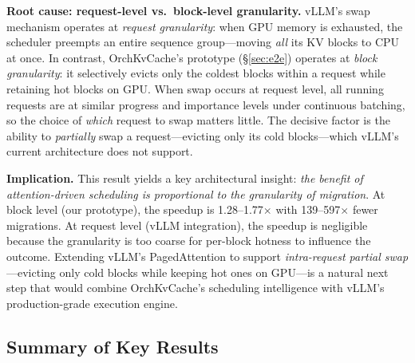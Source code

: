 \documentclass[conference]{IEEEtran}
\begin{document}
\textbf{Root cause: request-level vs.\ block-level granularity.} vLLM's swap mechanism operates at \emph{request granularity}: when GPU memory is exhausted, the scheduler preempts an entire sequence group---moving \emph{all} its KV blocks to CPU at once. In contrast, OrchKvCache's prototype (\S\ref{sec:e2e}) operates at \emph{block granularity}: it selectively evicts only the coldest blocks within a request while retaining hot blocks on GPU. When swap occurs at request level, all running requests are at similar progress and importance levels under continuous batching, so the choice of \emph{which} request to swap matters little. The decisive factor is the ability to \emph{partially} swap a request---evicting only its cold blocks---which vLLM's current architecture does not support.

\textbf{Implication.} This result yields a key architectural insight: \emph{the benefit of attention-driven scheduling is proportional to the granularity of migration}. At block level (our prototype), the speedup is 1.28--1.77$\times$ with 139--597$\times$ fewer migrations. At request level (vLLM integration), the speedup is negligible because the granularity is too coarse for per-block hotness to influence the outcome. Extending vLLM's PagedAttention to support \emph{intra-request partial swap}---evicting only cold blocks while keeping hot ones on GPU---is a natural next step that would combine OrchKvCache's scheduling intelligence with vLLM's production-grade execution engine.

\subsection{Summary of Key Results}
\end{document}
